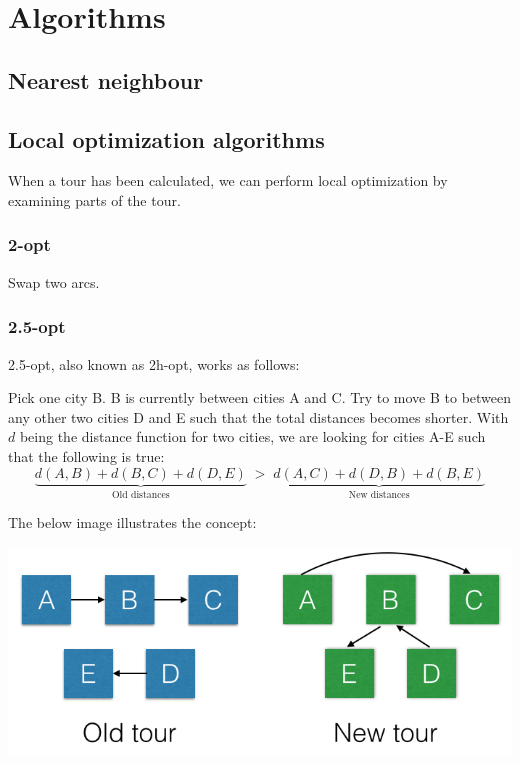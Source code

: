 \documentclass[paper=a4, fontsize=11pt,numbers=endperiod]{scrartcl} %
\numberwithin{equation}{section} %
\numberwithin{figure}{section} %
\numberwithin{table}{section} %
\begin{document}
\section{Algorithms}

\subsection{Nearest neighbour}

\subsection{Local optimization algorithms}
When a tour has been calculated, we can perform local optimization by examining parts of the tour.

\subsubsection{2-opt}
Swap two arcs.

\subsubsection{2.5-opt}
2.5-opt, also known as 2h-opt, works as follows:

Pick one city B. B is currently between cities A and C. Try to move B to between any other two cities D and E such that the total distances becomes shorter. With $d$ being the distance function for two cities, we are looking for cities A-E such that the following is true:
\[
    \underbrace{d(A,B) + d(B,C) + d(D,E)}_\text{Old distances}\; > \;\underbrace{d(A,C) + d(D,B) + d(B,E)}_\text{New distances}
\]

The below image illustrates the concept:

\begin{center}
\includegraphics[scale=0.4]{25opt}
\end{center}

    
\end{document}
